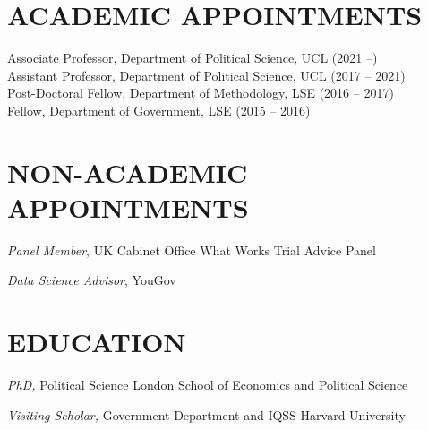 \documentclass[centered]{res}
\begin{document}
 
\address{Department of Political Science \\ University College London\\ Gower Street, London, WC1E 6BT }

\address{\faEnvelope \hfil \textcolor{white}{hi}\href{mailto:j.blumenau@ucl.ac.uk}{j.blumenau@ucl.ac.uk} \\ \faHome \hfil\href{http://www.jackblumenau.com}{jackblumenau.com} }%

 
\begin{resume}

\section{ACADEMIC APPOINTMENTS} 

Associate Professor, Department of Political Science, UCL (2021 --)\\
Assistant Professor, Department of Political Science, UCL (2017 -- 2021)\\
Post-Doctoral Fellow, Department of Methodology, LSE (2016 -- 2017)\\
Fellow, Department of Government, LSE (2015 -- 2016)


\section{NON-ACADEMIC APPOINTMENTS}



{\sl Panel Member}, UK Cabinet Office What Works Trial Advice Panel

\vspace{-.5cm}

{\sl Data Science Advisor}, YouGov


\section{EDUCATION} 



		{\sl PhD,} Political Science
                London School of Economics and Political Science

\vspace{-.25cm}

		{\sl Visiting Scholar,} Government Department and IQSS 
                 Harvard University  


\end{resume}
\end{document}
